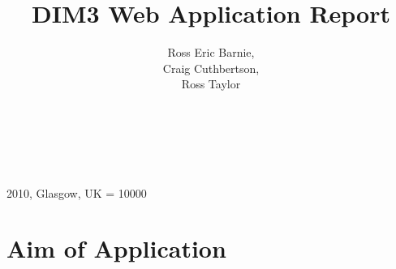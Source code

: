 \documentclass{sig-alt-release2}
\begin{document}
\newcommand{\todo}[1]{\textcolor{red}{#1}}
\def\newblock{\hskip .11em plus .33em minus .07em}

 {2010, Glasgow, UK} 
\widowpenalty = 10000

\title{DIM3 Web Application Report}

\author{
\alignauthor
Ross Eric Barnie, \\
Craig Cuthbertson, \\
Ross Taylor \\
\\
\\
\\
}
\maketitle

\begin{abstract}


\end{abstract}

\section{Aim of Application}

\end{document}
